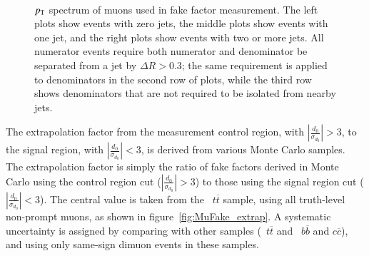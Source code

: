 \begin{figure}[h]
{  }\\

  \caption{\label{fig:MuFake_stacks}$p_{\text{T}}$ spectrum of muons used in fake factor measurement.  The left plots show events with zero jets, the middle
	plots show events with one jet, and the right plots show events with two or more jets.  All numerator events require both numerator and denominator be separated from a jet by $\Delta R > 0.3$; the same requirement is applied to denominators in the second row of plots, while the third row shows 
denominators that are not required to be isolated from nearby jets.}
\end{figure}


The extrapolation factor from the measurement control region, with $|\frac{d_0}{\sigma_{d_0}}|>3$, to the signal region, with $|\frac{d_0}{\sigma_{d_0}}|<3$, is derived from various Monte Carlo samples. The extrapolation factor is simply the ratio of fake factors derived in Monte Carlo using the control region cut ($|\frac{d_0}{\sigma_{d_0}}|>3$) to those using the signal region cut ($|\frac{d_0}{\sigma_{d_0}}|<3$). The central value is taken from the \powheg\ $t\overline{t}$ sample, using all truth-level non-prompt muons, as shown in figure~\ref{fig:MuFake_extrap}. A systematic uncertainty is assigned by comparing with other samples (\mcatnlo\ $t\overline{t}$ and \pythiab\ $b\overline{b}$ and $c\overline{c}$), and using only same-sign dimuon events in these samples.  

